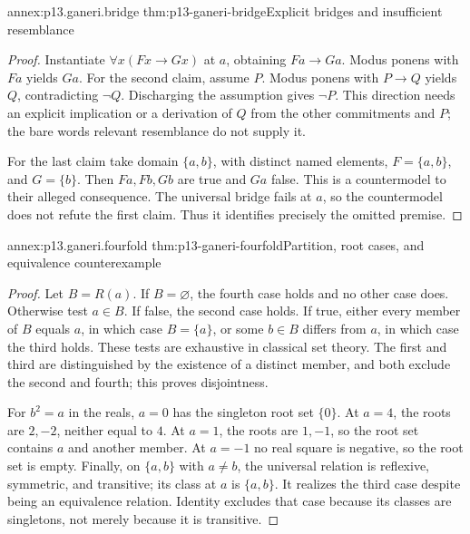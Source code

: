\begin{annexitem}{annex:p13.ganeri.bridge}
 {thm:p13-ganeri-bridge}{Explicit bridges and insufficient resemblance}
\begin{proof}
Instantiate \(\forall x(Fx\to Gx)\) at \(a\), obtaining \(Fa\to Ga\).
Modus ponens with \(Fa\) yields \(Ga\).
For the second claim, assume \(P\). Modus ponens with \(P\to Q\) yields
\(Q\), contradicting \(\neg Q\). Discharging the assumption gives
\(\neg P\). This direction needs an explicit implication or a derivation
of \(Q\) from the other commitments and \(P\); the bare words
relevant resemblance do not supply it.

For the last claim take domain \(\{a,b\}\), with distinct named elements,
\(F=\{a,b\}\), and \(G=\{b\}\). Then \(Fa,Fb,Gb\) are true and
\(Ga\) false. This is a countermodel to their alleged consequence.
The universal bridge fails at \(a\), so the countermodel does not refute
the first claim. Thus it identifies precisely the omitted premise.
\end{proof}
\end{annexitem}

\begin{annexitem}{annex:p13.ganeri.fourfold}
 {thm:p13-ganeri-fourfold}{Partition, root cases, and equivalence counterexample}
\begin{proof}
Let \(B=R(a)\). If \(B=\varnothing\), the fourth case holds and no other
case does. Otherwise test \(a\in B\). If false, the second case holds.
If true, either every member of \(B\) equals \(a\), in which case
\(B=\{a\}\), or some \(b\in B\) differs from \(a\), in which case
the third holds. These tests are exhaustive in classical set theory.
The first and third are distinguished by the existence of a distinct
member, and both exclude the second and fourth; this proves disjointness.

For \(b^2=a\) in the reals, \(a=0\) has the singleton root set \(\{0\}\).
At \(a=4\), the roots are \(2,-2\), neither equal to \(4\).
At \(a=1\), the roots are \(1,-1\), so the root set contains \(a\)
and another member. At \(a=-1\) no real square is negative, so the
root set is empty. Finally, on \(\{a,b\}\) with \(a\ne b\), the universal
relation is reflexive, symmetric, and transitive; its class at \(a\)
is \(\{a,b\}\). It realizes the third case despite being an equivalence
relation. Identity excludes that case because its classes are singletons,
not merely because it is transitive.
\end{proof}
\end{annexitem}

